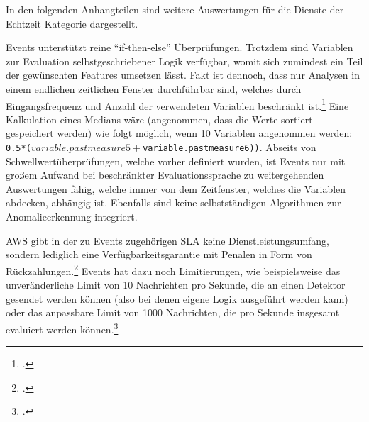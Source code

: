 \label{anhang:vergleich-echtzeit}
In den folgenden Anhangteilen sind weitere Auswertungen für die Dienste der Echtzeit Kategorie dargestellt.

\AWSIOT{} Events unterstützt reine \enquote{if-then-else} Überprüfungen. Trotzdem sind Variablen zur Evaluation selbstgeschriebener Logik verfügbar, womit sich zumindest ein Teil der gewünschten Features umsetzen lässt. Fakt ist dennoch, dass nur Analysen in einem endlichen zeitlichen Fenster durchführbar sind, welches durch Eingangsfrequenz und Anzahl der verwendeten Variablen beschränkt ist.\footcite[Vgl.][]{AmazonWebServicesInc..o.J.am} Eine Kalkulation eines Medians wäre (angenommen, dass die Werte sortiert gespeichert werden) wie folgt möglich, wenn 10 Variablen angenommen werden: \texttt{0.5*($variable.pastmeasure5 + $variable.pastmeasure6))}.
Abseits von Schwellwertüberprüfungen, welche vorher definiert wurden, ist \AWSIOT{} Events nur mit großem Aufwand bei beschränkter Evaluationssprache zu weitergehenden Auswertungen fähig, welche immer von dem Zeitfenster, welches die Variablen abdecken, abhängig ist. Ebenfalls sind keine selbstständigen Algorithmen zur Anomalieerkennung integriert.

\ac{AWS} gibt in der zu \AWSIOT{} Events zugehörigen \ac{SLA} keine Dienstleistungsumfang, sondern lediglich eine Verfügbarkeitsgarantie mit Penalen in Form von Rückzahlungen.\footcite[Vgl.][]{AmazonWebServicesInc..o.J.an} \AWSIOT{} Events hat dazu noch Limitierungen, wie beispielsweise das unveränderliche Limit von 10 Nachrichten pro Sekunde, die an einen Detektor gesendet werden können (also bei denen eigene Logik ausgeführt werden kann) oder das anpassbare Limit von 1000 Nachrichten, die pro Sekunde insgesamt evaluiert werden können.\footcite[Vgl.][]{AmazonWebServicesInc..o.J.ap}

